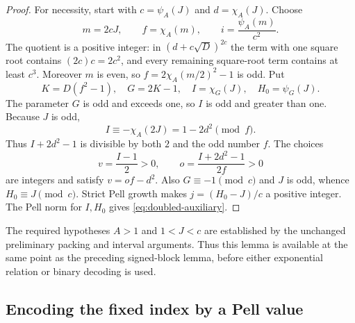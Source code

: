 \begin{proof}
For necessity, start with $c=\psi_A(J)$ and $d=\chi_A(J)$. Choose
\[
 m=2cJ,\qquad f=\chi_A(m),\qquad i=\frac{\psi_A(m)}{c^2}.
\]
The quotient is a positive integer: in
$(d+c\sqrt D)^{2c}$ the term with one square root contains
$(2c)c=2c^2$, and every remaining square-root term contains at least
$c^3$. Moreover $m$ is even, so
$f=2\chi_A(m/2)^2-1$ is odd. Put
\[
 K=D(f^2-1),\quad G=2K-1,\quad
 I=\chi_G(J),\quad H_0=\psi_G(J).
\]
The parameter $G$ is odd and exceeds one, so $I$ is odd and greater
than one. Because $J$ is odd,
\[
 I\equiv-\chi_A(2J)=1-2d^2\pmod f.
\]
Thus $I+2d^2-1$ is divisible by both $2$ and the odd number $f$.
The choices
\[
 v=\frac{I-1}{2}>0,\qquad
 o=\frac{I+2d^2-1}{2f}>0
\]
are integers and satisfy $v=of-d^2$. Also $G\equiv-1\pmod c$ and
$J$ is odd, whence $H_0\equiv J\pmod c$. Strict Pell growth makes
$j=(H_0-J)/c$ a positive integer. The Pell norm for $I,H_0$ gives
\eqref{eq:doubled-auxiliary}.
\end{proof}

The required hypotheses $A>1$ and $1<J<c$ are established by the
unchanged preliminary packing and interval arguments. Thus this lemma
is available at the same point as the preceding signed-block lemma,
before either exponential relation or binary decoding is used.

\subsection{Encoding the fixed index by a Pell value}

